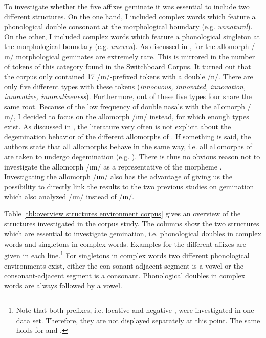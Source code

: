 To investigate whether the five affixes geminate it was essential to include two different structures. On the one hand, I included complex words which feature a phonological double consonant at the morphological boundary (e.g. \textit{unnatural}). On the other, I included complex words which feature a phonological singleton at the morphological boundary (e.g. \textit{uneven}). 
As discussed in , for the allomorph /ɪn/ morphological geminates are extremely rare. This is mirrored in the number of tokens of this category found in the Switchboard Corpus. It turned out that the corpus only contained 17 /ɪn/-prefixed tokens with a double /n/. There are only five different types with these tokens (\textit{innocuous, innovated, innovation, innovative, innovativeness}). Furthermore, out of these five types four share the same root. Because of the low frequency of double nasals with the allomorph /ɪn/, I decided to focus on the allomorph /ɪm/ instead, for which enough types exist. 
As discussed in , the literature very often is not explicit about the degemination behavior of the different allomorphs of . If something is said, the authors state that all allomorphs behave in the same way, i.e. all allomorphs of  are taken to undergo degemination (e.g. \citealt{Borowsky.1986, Cruttenden.2014}). There is thus no obvious reason not to investigate the allomorph /ɪm/ as a representative of the morpheme .  Investigating the allomorph /ɪm/ also has the advantage of giving us the possibility to directly link the results to the two previous studies on gemination which also analyzed /ɪm/ instead of /ɪn/. 

Table \ref{tbl:overview structures environment corpus} gives an overview of  the structures investigated in the corpus study. The columns show the two structures which are essential to investigate gemination, i.e. phonological doubles in complex words and singletons in complex words. Examples for the different affixes are given in each line.\footnote{Note that both prefixes, i.e. locative and negative , were investigated in one data set. Therefore, they are not displayed separately at this point. The same holds for  and .} 
For singletons in complex words two different phonological environments exist, either the con-sonant-adjacent segment is a vowel or the consonant-adjacent segment is a consonant. Phonological doubles in complex words are always followed by a vowel. 



